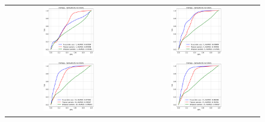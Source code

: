     \begin{figure}
        \centering
        \begin{tabular}{cc}
            \includegraphics[width = 0.42\textwidth, height= 0.3\textheight]{images/AUROC/Entropy_1.pdf} & 
            \includegraphics[width = 0.42\textwidth, height= 0.3\textheight]{images/AUROC/Entropy_5.pdf}\\ 
            \includegraphics[width = 0.42\textwidth, height= 0.3\textheight]{images/AUROC/Entropy_10.pdf} &
            \includegraphics[width = 0.42\textwidth, height= 0.3\textheight]{images/AUROC/Entropy_15.pdf} \\ 

\end{tabular}
\end{figure}
